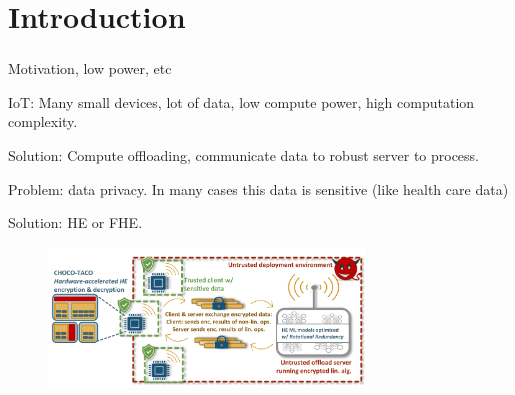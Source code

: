 \documentclass[10pt]{beamer}
\begin{document}

\section{Introduction}

\begin{frame}
    \frametitle{}
        Motivation, low power, etc

        IoT: Many small devices, lot of data, low compute power, high computation complexity.

        Solution: Compute offloading, communicate data to robust server to process.

        Problem: data privacy. In many cases this data is sensitive (like health care data)


        Solution: HE or FHE.
        \begin{figure}
            \includegraphics[width=0.75\textwidth]{model.png}
        \end{figure}


\end{frame}
\end{document}
